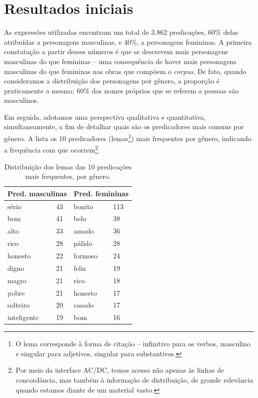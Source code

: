\documentclass[portuguese]{textolivre}
\begin{document}
\section{Resultados iniciais}\label{sec-normas}
As expressões utilizadas encontram um total de 3.862 predicações, 60\% delas atribuídas a personagens masculinas, e 40\%, a personagens femininas. A primeira constatação a partir desses números é que se descrevem mais personagens masculinas do que femininas – uma consequência de haver mais personagens masculinas do que femininas nas obras que compõem o \textit{corpus}. De fato, quando consideramos a distribuição dos personagens por gênero, a proporção é praticamente a mesma: 60\% dos nomes próprios que se referem a pessoas são masculinos.

Em seguida, adotamos uma perspectiva qualitativa e quantitativa, simultaneamente, a fim de detalhar quais são os predicadores mais comuns por gênero. A  lista os 10 predicadores (lemas\footnote{O lema corresponde à forma de citação – infinitivo para os verbos, masculino e singular para adjetivos, singular para substantivos.}) mais frequentes por gênero, indicando a frequência com que ocorrem\footnote{Por meio da interface AC/DC, temos acesso não apenas às linhas de concordância, mas também à informação de distribuição, de grande relevância quando estamos diante de um material vasto.}.

\begin{table}[htbp]
\caption{Distribuição dos lemas das 10 predicações mais frequentes, por gênero.}
\label{tbl2}
\centering
\begin{tabular}{llll}
\toprule
\multicolumn{2}{l}{Pred. masculinas} & \multicolumn{2}{l}{Pred. femininas} \\ \midrule
sério     & 43 & bonito   & 113  \\ 
bom       & 41 & belo     & 38   \\ 
alto      & 33 & amado    & 36   \\
rico      & 28 & pálido   & 28   \\ 
honesto   & 22 & formoso  & 24   \\ 
digno     & 21 & feliz    & 19   \\ 
magro     & 21 & rico     & 18   \\ 
pobre     & 21 & honesto  & 17   \\ 
solteiro  & 20 & casado   & 17   \\ 
inteligente & 19 & bom    & 16   \\ 
\bottomrule
\end{tabular}
\end{table}
\end{document}
